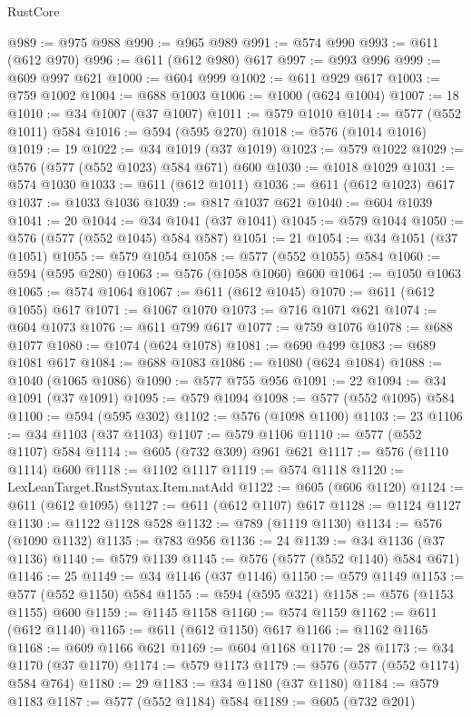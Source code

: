 \begin{lexlean}{RustCore}
\begin{coremodule}
@989 := @975 @988
@990 := @965 @989
@991 := @574 @990
@993 := @611 (@612 @970)
@996 := @611 (@612 @980) @617
@997 := @993 @996
@999 := @609 @997 @621
@1000 := @604 @999
@1002 := @611 @929 @617
@1003 := @759 @1002
@1004 := @688 @1003
@1006 := @1000 (@624 @1004)
@1007 := 18
@1010 := @34 @1007 (@37 @1007)
@1011 := @579 @1010
@1014 := @577 (@552 @1011) @584
@1016 := @594 (@595 @270)
@1018 := @576 (@1014 @1016)
@1019 := 19
@1022 := @34 @1019 (@37 @1019)
@1023 := @579 @1022
@1029 := @576 (@577 (@552 @1023) @584 @671) @600
@1030 := @1018 @1029
@1031 := @574 @1030
@1033 := @611 (@612 @1011)
@1036 := @611 (@612 @1023) @617
@1037 := @1033 @1036
@1039 := @817 @1037 @621
@1040 := @604 @1039
@1041 := 20
@1044 := @34 @1041 (@37 @1041)
@1045 := @579 @1044
@1050 := @576 (@577 (@552 @1045) @584 @587)
@1051 := 21
@1054 := @34 @1051 (@37 @1051)
@1055 := @579 @1054
@1058 := @577 (@552 @1055) @584
@1060 := @594 (@595 @280)
@1063 := @576 (@1058 @1060) @600
@1064 := @1050 @1063
@1065 := @574 @1064
@1067 := @611 (@612 @1045)
@1070 := @611 (@612 @1055) @617
@1071 := @1067 @1070
@1073 := @716 @1071 @621
@1074 := @604 @1073
@1076 := @611 @799 @617
@1077 := @759 @1076
@1078 := @688 @1077
@1080 := @1074 (@624 @1078)
@1081 := @690 @499
@1083 := @689 @1081 @617
@1084 := @688 @1083
@1086 := @1080 (@624 @1084)
@1088 := @1040 (@1065 @1086)
@1090 := @577 @755 @956
@1091 := 22
@1094 := @34 @1091 (@37 @1091)
@1095 := @579 @1094
@1098 := @577 (@552 @1095) @584
@1100 := @594 (@595 @302)
@1102 := @576 (@1098 @1100)
@1103 := 23
@1106 := @34 @1103 (@37 @1103)
@1107 := @579 @1106
@1110 := @577 (@552 @1107) @584
@1114 := @605 (@732 @309) @961 @621
@1117 := @576 (@1110 @1114) @600
@1118 := @1102 @1117
@1119 := @574 @1118
@1120 := LexLeanTarget.RustSyntax.Item.natAdd
@1122 := @605 (@606 @1120)
@1124 := @611 (@612 @1095)
@1127 := @611 (@612 @1107) @617
@1128 := @1124 @1127
@1130 := @1122 @1128 @528
@1132 := @789 (@1119 @1130)
@1134 := @576 (@1090 @1132)
@1135 := @783 @956
@1136 := 24
@1139 := @34 @1136 (@37 @1136)
@1140 := @579 @1139
@1145 := @576 (@577 (@552 @1140) @584 @671)
@1146 := 25
@1149 := @34 @1146 (@37 @1146)
@1150 := @579 @1149
@1153 := @577 (@552 @1150) @584
@1155 := @594 (@595 @321)
@1158 := @576 (@1153 @1155) @600
@1159 := @1145 @1158
@1160 := @574 @1159
@1162 := @611 (@612 @1140)
@1165 := @611 (@612 @1150) @617
@1166 := @1162 @1165
@1168 := @609 @1166 @621
@1169 := @604 @1168
@1170 := 28
@1173 := @34 @1170 (@37 @1170)
@1174 := @579 @1173
@1179 := @576 (@577 (@552 @1174) @584 @764)
@1180 := 29
@1183 := @34 @1180 (@37 @1180)
@1184 := @579 @1183
@1187 := @577 (@552 @1184) @584
@1189 := @605 (@732 @201)

\end{coremodule}
\end{lexlean}

